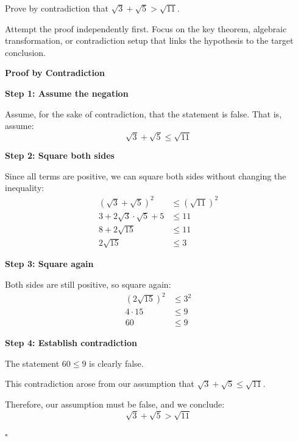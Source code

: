 
\begin{problem}
Prove by contradiction that $\sqrt{3} + \sqrt{5} > \sqrt{11}$.
\end{problem}

\begin{hint}
Attempt the proof independently first. Focus on the key theorem, algebraic transformation, or contradiction setup that links the hypothesis to the target conclusion.
\end{hint}

\begin{solution}
\textbf{Proof by Contradiction}

\textbf{Step 1: Assume the negation}

Assume, for the sake of contradiction, that the statement is false. That is, assume:
\[ \sqrt{3} + \sqrt{5} \leq \sqrt{11} \]

\textbf{Step 2: Square both sides}

Since all terms are positive, we can square both sides without changing the inequality:
\begin{align*}
    (\sqrt{3} + \sqrt{5})^2 &\leq (\sqrt{11})^2 \\
    3 + 2\sqrt{3}\cdot\sqrt{5} + 5 &\leq 11 \\
    8 + 2\sqrt{15} &\leq 11 \\
    2\sqrt{15} &\leq 3
\end{align*}

\textbf{Step 3: Square again}

Both sides are still positive, so square again:
\begin{align*}
    (2\sqrt{15})^2 &\leq 3^2 \\
    4 \cdot 15 &\leq 9 \\
    60 &\leq 9
\end{align*}

\textbf{Step 4: Establish contradiction}

The statement $60 \leq 9$ is clearly false.

This contradiction arose from our assumption that $\sqrt{3} + \sqrt{5} \leq \sqrt{11}$.

Therefore, our assumption must be false, and we conclude:
\[ \sqrt{3} + \sqrt{5} > \sqrt{11} \]

\hfill $\square$
\end{solution}

